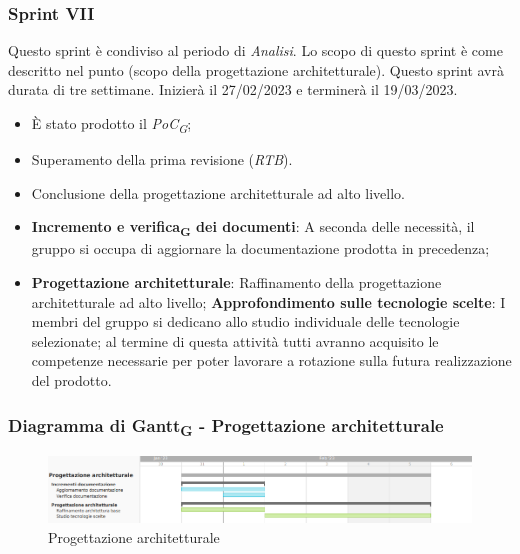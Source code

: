 \subsubsection{Sprint VII}
Questo sprint è condiviso al periodo di \textit{Analisi}. Lo scopo di questo sprint è come descritto nel punto (scopo della progettazione architetturale).
Questo sprint avrà durata di tre settimane. Inizierà il 27/02/2023 e terminerà il 19/03/2023.

\:
\begin{itemize}
    \item È stato prodotto il \textit{PoC\textsubscript{G}};
    \item Superamento della prima revisione (\textit{RTB}).
\end{itemize}

\:
\begin{itemize}
    \item Conclusione della progettazione architetturale ad alto livello.
\end{itemize}

\:
\begin{itemize}
    \item \textbf{Incremento e verifica\textsubscript{G} dei documenti}: A seconda delle necessità, il gruppo si occupa di aggiornare la documentazione prodotta in precedenza;
    \item \textbf{Progettazione architetturale}: Raffinamento della progettazione architetturale ad alto livello;
        \subitem \textbf{Approfondimento sulle tecnologie scelte}: I membri del gruppo si dedicano allo studio individuale delle tecnologie selezionate; al termine di questa attività tutti avranno acquisito le competenze necessarie per poter lavorare a rotazione sulla futura realizzazione del prodotto.
\end{itemize}

\subsubsection{Diagramma di Gantt\textsubscript{G} - Progettazione architetturale}

\begin{figure}[H]
\centering
\includegraphics[width=\textwidth]{img/4_progettazione.png}
\caption{Progettazione architetturale}
\end{figure}

